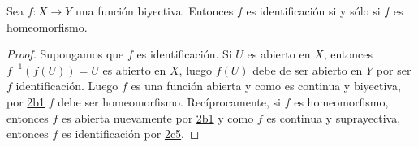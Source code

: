 

\begin{proposition}
Sea $f : X \longrightarrow Y$ una función biyectiva. Entonces $f$ es identificación si y sólo si $f$ es homeomorfismo.
\end{proposition}

\begin{proof}
Supongamos que $f$ es identificación. Si $U$ es abierto en $X$, entonces $f^{-1}(f(U)) = U$ es abierto en $X$, luego $f(U)$ debe de ser abierto en $Y$ por ser $f$ identificación. Luego $f$ es una función abierta y como es continua y biyectiva, por \hyperref[card:2b1]{\textsf{2b1}} $f$ debe ser homeomorfismo. Recíprocamente, si $f$ es homeomorfismo, entonces $f$ es abierta nuevamente por \hyperref[card:2b1]{\textsf{2b1}} y como $f$ es continua y suprayectiva, entonces $f$ es identificación por \hyperref[card:2c5]{\textsf{2c5}}.
\end{proof}
